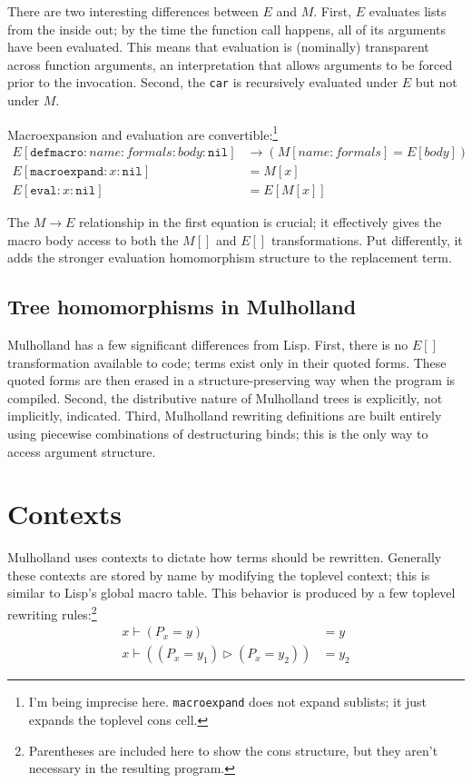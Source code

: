\documentclass{report}
\begin{document}
    There are two interesting differences between $E$ and $M$. First, $E$ evaluates lists from the inside out; by the time the function call happens, all of its arguments have been evaluated.
    This means that evaluation is (nominally) transparent across function arguments, an interpretation that allows arguments to be forced prior to the invocation. Second, the {\tt car} is
    recursively evaluated under $E$ but not under $M$.

    Macroexpansion and evaluation are convertible:\footnote{I'm being imprecise here. {\tt macroexpand} does not expand sublists; it just expands the toplevel cons cell.}
\begin{align*}
E[\texttt{defmacro}:name:formals:body:\texttt{nil}] & \rightarrow (M[name:formals] = E[body]) \\
E[\texttt{macroexpand}:x:\texttt{nil}]              & = M[x] \\
E[\texttt{eval}:x:\texttt{nil}]                     & = E[M[x]]
\end{align*}

    The $M \rightarrow E$ relationship in the first equation is crucial; it effectively gives the macro body access to both the $M[]$ and $E[]$ transformations. Put differently, it adds the
    stronger evaluation homomorphism structure to the replacement term.

\section{Tree homomorphisms in Mulholland}
    Mulholland has a few significant differences from Lisp. First, there is no $E[]$ transformation available to code; terms exist only in their quoted forms. These quoted forms are then
    erased in a structure-preserving way when the program is compiled. Second, the distributive nature of Mulholland trees is explicitly, not implicitly, indicated. Third, Mulholland rewriting
    definitions are built entirely using piecewise combinations of destructuring binds; this is the only way to access argument structure.

\chapter{Contexts}
  Mulholland uses contexts to dictate how terms should be rewritten. Generally these contexts are stored by name by modifying the toplevel context; this is similar to Lisp's global macro
  table. This behavior is produced by a few toplevel rewriting rules:\footnote{Parentheses are included here to show the cons structure, but they aren't necessary in the resulting program.}
\begin{align*}
x \vdash (P_x = y)                      & = y \\
x \vdash ((P_x = y_1) \rhd (P_x = y_2)) & = y_2
\end{align*}
\end{document}
